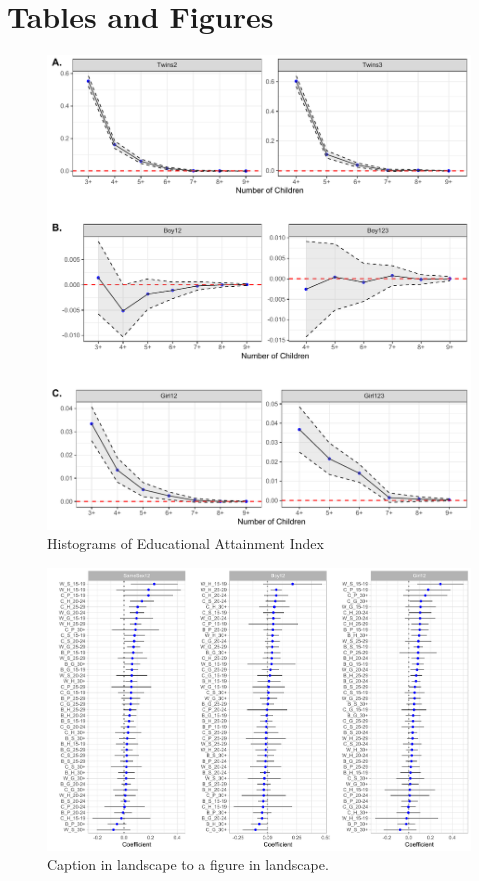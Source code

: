 \documentclass[11pt,a4paper]{article}
\begin{document}
\begin{onehalfspace}



\newpage
\printbibliography

\end{onehalfspace}

\newpage
\section*{Tables and Figures}

\begin{figure}[h!]
\centering
\caption{\label{fig:01}Histograms of Educational Attainment Index}
\includegraphics[width=\textwidth]{figures/acrs.pdf}
\end{figure}

\begin{figure}
\centering
\caption{\label{fig:02}Caption in landscape to a figure in landscape.}
\includegraphics[width=\textwidth]{figures/monot.pdf}
\end{figure}
\end{document}
